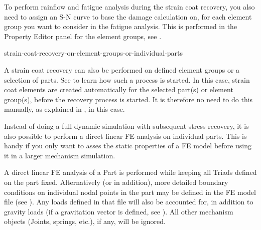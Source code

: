 {To perform rainflow and fatigue analysis during the strain coat recovery,
you also need to assign an S-N curve to base the damage calculation on,
for each element group you want to consider in the fatigue analysis.
This is performed in the Property Editor panel for the element groups,
see .





           {strain-coat-recovery-on-element-groups-or-individual-parts}

A strain coat recovery can also be performed on defined element groups
or a selection of parts.
See 
to learn how such a process is started.
In this case, strain coat elements are created automatically for the
selected part(s) or element group(s), before the recovery process is started.
It is therefore no need to do this manually, as explained in
, in this case.



Instead of doing a full dynamic simulation with subsequent stress recovery,
it is also possible to perform a direct linear FE analysis on individual parts.
This is handy if you only want to asses the static properties of a FE model
before using it in a larger mechanism simulation.

A direct linear FE analysis of a Part is performed while keeping all Triads
defined on the part fixed. Alternatively (or in addition), more detailed
boundary conditions on individual nodal points in the part may be defined in
the FE model file (see ).
Any loads defined in that file will also be accounted for,
in addition to gravity loads (if a gravitation vector is defined,
see ).
All other mechanism objects (Joints, springs, etc.), if any, will be ignored.

}
